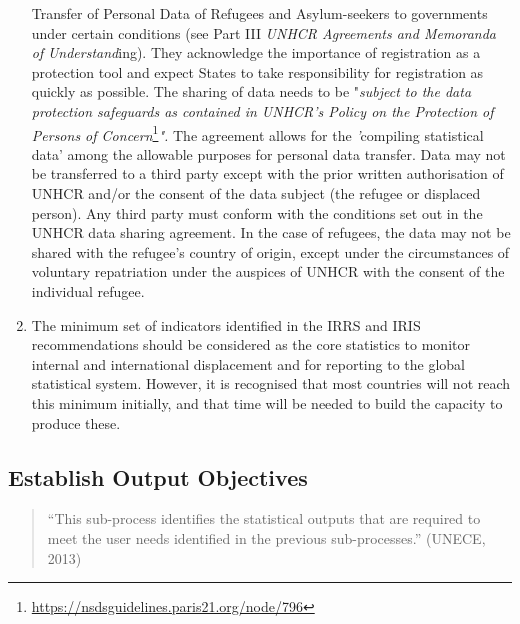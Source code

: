 \documentclass[
]{article}
\begin{document}
\begin{enumerate}
  Transfer of Personal Data of Refugees and Asylum-seekers to
  governments under certain conditions (see Part III \emph{UNHCR Agreements
  and Memoranda of} \emph{Understand}ing). They acknowledge the importance
  of registration as a protection tool and expect States to take
  responsibility for registration as quickly as possible. The sharing
  of data needs to be "\emph{subject to the data protection safeguards as
  contained in UNHCR's Policy on the Protection of Persons of
  Concern}\footnote{\url{https://nsdsguidelines.paris21.org/node/796}}\emph{".} The agreement allows for the \emph{'}compiling
  statistical data' among the allowable purposes for personal data
  transfer. Data may not be transferred to a third party except with
  the prior written authorisation of UNHCR and/or the consent of the
  data subject (the refugee or displaced person). Any third party must
  conform with the conditions set out in the UNHCR data sharing
  agreement. In the case of refugees, the data may not be shared with
  the refugee's country of origin, except under the circumstances of
  voluntary repatriation under the auspices of UNHCR with the consent
  of the individual refugee.
\item
  The minimum set of indicators identified in the IRRS and IRIS
  recommendations should be considered as the core statistics to
  monitor internal and international displacement and for reporting to
  the global statistical system. However, it is recognised that most
  countries will not reach this minimum initially, and that time will
  be needed to build the capacity to produce these.
\end{enumerate}

\hypertarget{establish-output-objectives-1}{%
\subsection{Establish Output Objectives}\label{establish-output-objectives-1}}

\begin{quote}
``This sub-process identifies the statistical outputs that are required
to meet the user needs identified in the previous sub-processes.''
(UNECE, 2013)
\end{quote}
\end{document}
